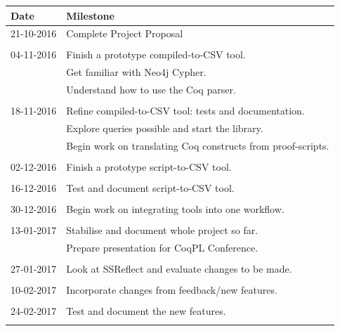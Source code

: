 \documentclass[12pt]{article}
\begin{document}
\begin{tabular}{ll }
    \toprule

    Date & Milestone \\

    \midrule

	21-10-2016	&	Complete Project Proposal \\ \\
          
	04-11-2016	&	Finish a prototype compiled-to-CSV tool. \\ 
				&	Get familiar with Neo4j Cypher. \\
				&	Understand how to use the Coq parser. \\ \\

	18-11-2016	&	Refine compiled-to-CSV tool: tests and documentation. \\
				&	Explore queries possible and start the library. \\
				&	Begin work on translating Coq constructs from proof-scripts. \\ \\

    02-12-2016	&	Finish a prototype script-to-CSV tool. \\ \\

    16-12-2016	&	Test and document script-to-CSV tool. \\ \\

    30-12-2016	&	Begin work on integrating tools into one workflow. \\ \\

	13-01-2017	&	Stabilise and document whole project so far. \\
				&	Prepare presentation for CoqPL Conference. \\ \\

    27-01-2017	&	Look at SSReflect and evaluate changes to be made. \\ \\

    10-02-2017	&	Incorporate changes from feedback/new features. \\ \\

    24-02-2017	&	Test and document the new features. \\ \\


\end{tabular}
\end{document}
